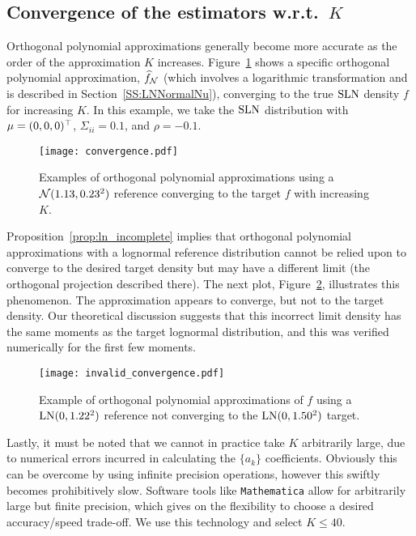 \subsection{Convergence of the estimators  w.r.t.\ $K$ }

Orthogonal polynomial approximations generally become more accurate as the order of the approximation $K$ increases. Figure~\ref{fig:converg} shows a specific orthogonal polynomial approximation, $\widehat{f}_{\mathcal{N}}$ (which involves a logarithmic transformation and is described in Section~\ref{SS:LNNormalNu}), converging to the true $\mathrm{SLN}$ density $f$ for increasing $K$. In this example, we take the $\mathrm{SLN}$ distribution with $\mu=(0,0,0)^\top$, $\Sigma_{ii} = 0.1$, and $\rho = -0.1$.

\begin{figure}
\centering
\texttt{[image: convergence.pdf]}
\caption{Examples of orthogonal polynomial approximations using a $\mathcal{N}(1.13,0.23^2)$ reference converging to the target $f$ with increasing $K$.}
\label{fig:converg}
\end{figure}

Proposition~\ref{prop:ln_incomplete} implies that orthogonal polynomial approximations with a lognormal reference distribution cannot be relied upon to converge to the desired target density but may have a different limit (the orthogonal projection described there). The next plot, Figure~\ref{fig:bad_converge}, illustrates this phenomenon. The approximation appears to converge, but not to the target density.
Our theoretical discussion suggests that this incorrect limit density has the same moments as the target lognormal distribution,
and this was verified numerically for the first few moments.

\begin{figure}
\centering
\texttt{[image: invalid\_convergence.pdf]}

\caption{Example of orthogonal polynomial approximations of $f$ using a $\mathrm{LN}(0, 1.22^2)$ reference not converging to the $\mathrm{LN}(0, 1.50^2)$ target.}
\label{fig:bad_converge}
\end{figure}

Lastly, it must be noted that we cannot in practice take $K$ arbitrarily large, due to numerical errors incurred in calculating the $\{a_k\}$ coefficients. Obviously this can be overcome by using infinite precision operations, however this swiftly becomes prohibitively slow. Software tools like \texttt{Mathematica} allow for arbitrarily large but finite precision, which gives on the flexibility to choose a desired accuracy/speed trade-off. We use this technology and select $K \le 40$.

